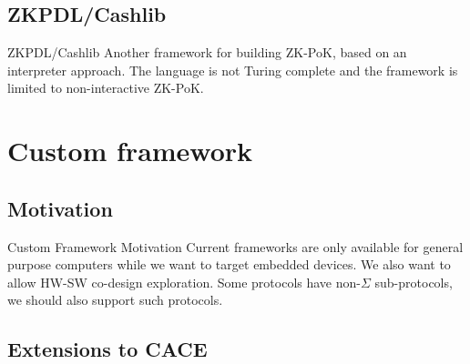 \documentclass{beamer}
\begin{document}
\subsection{ZKPDL/Cashlib}

\begin{frame}{ZKPDL/Cashlib}
  Another framework for building ZK-PoK, based on an interpreter
  approach. The language is not Turing complete and the framework is
  limited to non-interactive ZK-PoK.
\end{frame}

\section{Custom framework}

\subsection{Motivation}

\begin{frame}{Custom Framework Motivation}
  Current frameworks are only available for general purpose computers
  while we want to target embedded devices. We also want to allow
  HW-SW co-design exploration.
  \vfill
  \pause
  Some protocols have non-$\Sigma$ sub-protocols, we should also support
  such protocols.
\end{frame}

\subsection{Extensions to CACE}
\end{document}
